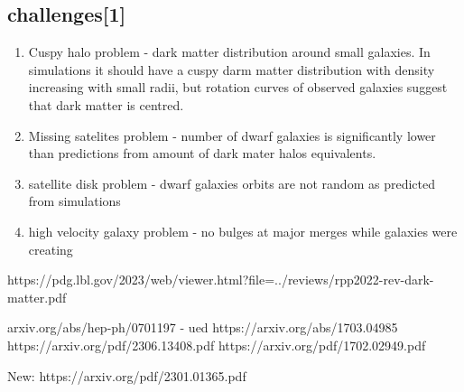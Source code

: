 \documentclass{article}
\begin{document}
\subsection{challenges[1]}
\begin{enumerate}
    \item Cuspy halo problem - dark matter distribution around small galaxies. In simulations it should have a cuspy darm matter distribution with density increasing with small radii, but rotation curves of observed galaxies suggest that dark matter is centred. 
    \item Missing satelites problem - number of dwarf galaxies is significantly lower than predictions from amount of dark mater halos equivalents.  
    \item satellite disk problem - dwarf galaxies orbits are not random as predicted from simulations 
    \item high velocity galaxy problem - no bulges at major merges while galaxies were creating 
\end{enumerate}










https://pdg.lbl.gov/2023/web/viewer.html?file=../reviews/rpp2022-rev-dark-matter.pdf








arxiv.org/abs/hep-ph/0701197 - ued
https://arxiv.org/abs/1703.04985
https://arxiv.org/pdf/2306.13408.pdf
https://arxiv.org/pdf/1702.02949.pdf 

New:
https://arxiv.org/pdf/2301.01365.pdf
\end{document}
